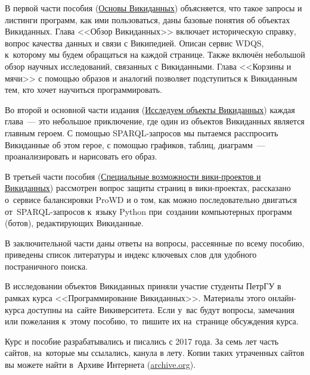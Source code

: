 В первой части пособия (\hyperref[part:foundation]{Основы Викиданных}) объясняется, 
что такое запросы и листинги программ, как ими пользоваться, даны базовые понятия об объектах Викиданных. 
Глава <<Обзор Викиданных>> включает историческую справку, 
вопрос качества данных и связи с Википедией. 
Описан сервис WDQS, к~которому мы будем обращаться на каждой странице. 
Также включён небольшой обзор научных исследований, связанных с Викиданными. 
Глава <<Корзины и мячи>> с помощью образов и аналогий позволяет подступиться к Викиданным тем, 
кто хочет научиться программировать. 


Во второй и основной части издания (\hyperref[part:research]{Исследуем объекты Викиданных}) каждая 
глава~--- это небольшое приключение, 
где один из объектов Викиданных является главным героем. 
С помощью SPARQL-запросов мы пытаемся расспросить Викиданные об этом герое, 
с помощью графиков, таблиц, диаграмм~--- проанализировать и нарисовать его образ. 



\newpage
В третьей части пособия (\hyperref[part:advanced]
                                  {Специальные возможности вики-проектов и Викиданных}) 
рассмотрен вопрос защиты страниц в вики-проектах, 
рассказано о~сервисе балансировки ProWD и о том, 
как можно последовательно двигаться от~SPARQL-запросов 
к~языку Python при~создании компьютерных программ (ботов), редактирующих Викиданные. 


В заключительной части 
даны ответы на вопросы, рассеянные по всему пособию, приведены список литературы 
и индекс ключевых слов для удобного постраничного поиска.

В исследовании объектов Викиданных приняли участие студенты ПетрГУ в рамках курса <<Программирование Викиданных>>. 
Материалы этого онлайн-курса доступны на~сайте Викиверситета. 
Если у~вас будут вопросы, замечания или пожелания к~этому пособию, 
то~пишите их на~странице обсуждения курса. 

Курс и пособие разрабатывались и писались с 2017 года. За семь лет часть сайтов, на~которые мы ссылались, канула в лету. 
Копии таких утраченных сайтов вы можете найти в~Архиве Интернета (\href{https://archive.org/}{archive.org}).

